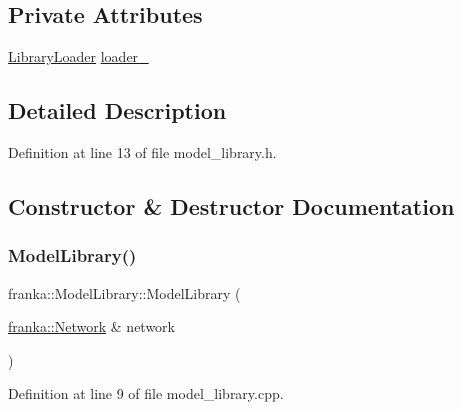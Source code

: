 \subsection*{Private Attributes}
\begin{DoxyCompactItemize}
\item 
\hyperlink{classfranka_1_1LibraryLoader}{Library\+Loader} \hyperlink{classfranka_1_1ModelLibrary_a77588a6e71629cfff0ff8b0c50ddc349}{loader\+\_\+}
\end{DoxyCompactItemize}


\subsection{Detailed Description}


Definition at line 13 of file model\+\_\+library.\+h.



\subsection{Constructor \& Destructor Documentation}
\mbox{\label{classfranka_1_1ModelLibrary_a3f15c2a63dc31a7312ac37a106d18dcf}} 
\subsubsection{\texorpdfstring{Model\+Library()}{ModelLibrary()}}
{\footnotesize\ttfamily franka\+::\+Model\+Library\+::\+Model\+Library (\begin{DoxyParamCaption}\item[{\hyperlink{classfranka_1_1Network}{franka\+::\+Network} \&}]{network }\end{DoxyParamCaption})}



Definition at line 9 of file model\+\_\+library.\+cpp.



